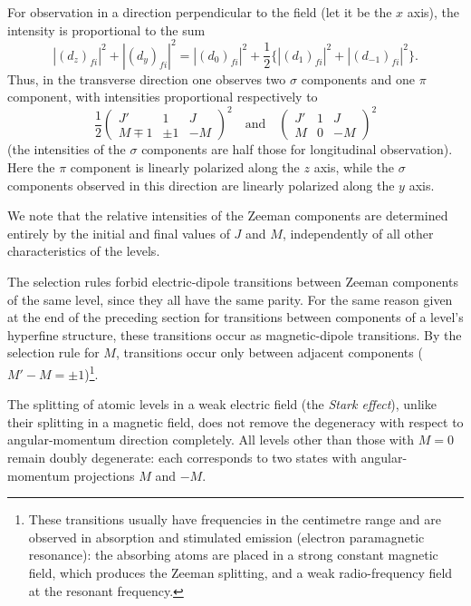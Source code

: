 For observation in a direction perpendicular to the field (let it be the $x$ axis), the intensity is proportional to the sum
\[
|(d_z)_{fi}|^2+|(d_y)_{fi}|^2
=|(d_0)_{fi}|^2+\frac12\{|(d_1)_{fi}|^2+|(d_{-1})_{fi}|^2\}.
\]
Thus, in the transverse direction one observes two $\sigma$ components and one $\pi$ component, with intensities proportional respectively to
\begin{equation}
\frac12\begin{pmatrix}J'&1&J\\M\mp1&\pm1&-M\end{pmatrix}^{\!2}
\quad\text{and}\quad
\begin{pmatrix}J'&1&J\\M&0&-M\end{pmatrix}^{\!2}
\tag{51.8}
\end{equation}
(the intensities of the $\sigma$ components are half those for longitudinal observation). Here the $\pi$ component is linearly polarized along the $z$ axis, while the $\sigma$ components observed in this direction are linearly polarized along the $y$ axis.

We note that the relative intensities of the Zeeman components are determined entirely by the initial and final values of $J$ and $M$, independently of all other characteristics of the levels.

The selection rules forbid electric-dipole transitions between Zeeman components of the same level, since they all have the same parity. For the same reason given at the end of the preceding section for transitions between components of a level's hyperfine structure, these transitions occur as magnetic-dipole transitions. By the selection rule for $M$, transitions occur only between adjacent components ($M'-M=\pm1$)\footnote{These transitions usually have frequencies in the centimetre range and are observed in absorption and stimulated emission (electron paramagnetic resonance): the absorbing atoms are placed in a strong constant magnetic field, which produces the Zeeman splitting, and a weak radio-frequency field at the resonant frequency.}.

The splitting of atomic levels in a weak electric field (the \emph{Stark effect}), unlike their splitting in a magnetic field, does not remove the degeneracy with respect to angular-momentum direction completely. All levels other than those with $M=0$ remain doubly degenerate: each corresponds to two states with angular-momentum projections $M$ and $-M$.

